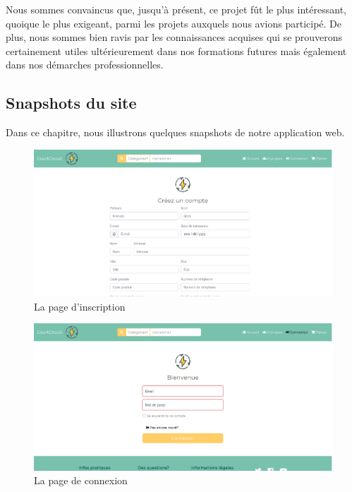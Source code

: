 \documentclass[a4paper,12pt]{report}
\theoremstyle{break}
\theoremstyle{break}
\theoremstyle{break}
\theoremstyle{break}
\theoremstyle{definition}
\theoremstyle{remark}
\begin{document}
Nous sommes convaincus que, jusqu'à présent, ce projet fût le plus intéressant, quoique le plus exigeant, parmi les projets auxquels nous avions participé. De plus, nous sommes bien ravis par les connaissances acquises qui se prouverons certainement utiles ultérieurement dans nos formations futures mais également dans nos démarches professionnelles.
\begin{appendices}
\setcounter{page}{1}

\chapter{Snapshots du site}
Dans ce chapitre, nous illustrons quelques snapshots de notre application web.

\begin{figure}[!ht]
  \centering
  \includegraphics[scale=0.35]{images/signUp.png}
  \caption{La page d'inscription}
\end{figure}

\begin{figure}[!ht]
  \centering
  \includegraphics[scale=0.35]{images/signIn.png}
  \caption{La page de connexion}
\end{figure}


\end{appendices}
\end{document}
